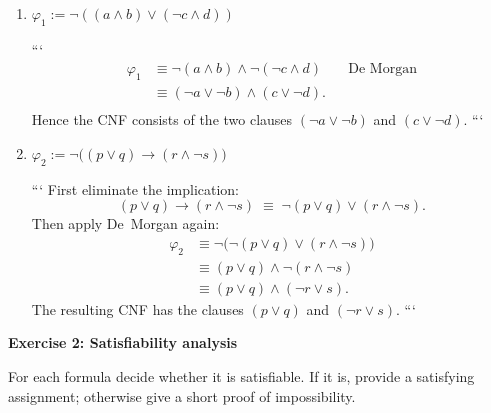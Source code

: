 \documentclass{article}
\theoremstyle{theorem}
\theoremstyle{definition}
\theoremstyle{remark}
\begin{document}
\begin{enumerate}
\item $\varphi_1 := \neg((a \land b) \lor (\neg c \land d))$

```
    \begin{align*}
      \varphi_1
        &\equiv \neg(a \land b) \land \neg(\neg c \land d) && \text{De~Morgan}\\
        &\equiv (\neg a \lor \neg b) \land (c \lor \neg d).\\[-6pt]
    \end{align*}
    Hence the CNF consists of the two clauses $(\neg a \lor \neg b)$ and $(c \lor \neg d)$.
```

\item $\varphi_2 := \neg\bigl((p \lor q) \rightarrow (r \land \neg s)\bigr)$

```
    First eliminate the implication:
    \[(p \lor q) \rightarrow (r \land \neg s)\;\equiv\; \neg(p \lor q) \lor (r \land \neg s).\]
    Then apply De~Morgan again:
    \begin{align*}
      \varphi_2
        &\equiv \neg\bigl(\neg(p \lor q) \lor (r \land \neg s)\bigr)\\
        &\equiv (p \lor q) \land \neg(r \land \neg s)\\
        &\equiv (p \lor q) \land (\neg r \lor s).
    \end{align*}
    The resulting CNF has the clauses $(p \lor q)$ and $(\neg r \lor s)$.
```

\end{enumerate}

\bigskip
\textbf{Exercise 2: Satisfiability analysis}

For each formula decide whether it is satisfiable.  
If it is, provide a satisfying assignment; otherwise give a short proof of impossibility.
\end{document}
